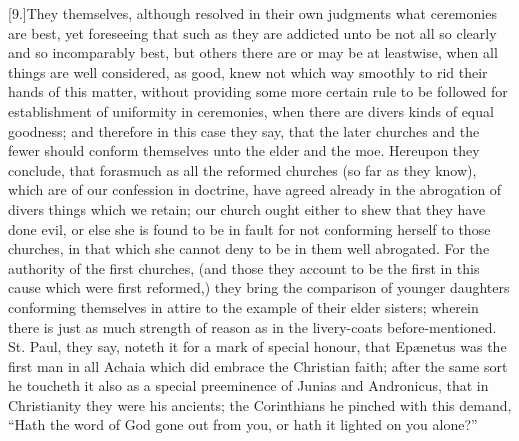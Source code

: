 [9.]They themselves, although resolved in their own judgments what ceremonies are best, yet foreseeing that such as they are addicted unto be not all so clearly and so incomparably best, but others there are or may be at leastwise, when all things are well considered, as good, knew not which way smoothly to rid their hands of this matter, without providing some more certain rule to be followed for establishment of uniformity in ceremonies, when there are divers kinds of equal goodness; and therefore in this case they say, that the later churches and the fewer should conform themselves unto the elder and the moe. Hereupon they conclude, that forasmuch as all the reformed churches (so far as they know), which are of our confession in doctrine, have agreed already in the abrogation of divers things which we retain; our church ought either to shew that they have done evil, or else she is found to be in fault for not conforming herself to those churches, in that which she cannot deny to be in them well abrogated. For the authority of the first churches, (and those they account to be the first in this cause which were first reformed,) they bring the comparison of younger daughters conforming themselves in attire to the example of their elder sisters; wherein there is just as much strength of reason as in the livery-coats before-mentioned. St. Paul, they say, noteth it for a mark of special honour, that Epænetus was the first man in all Achaia which did embrace the Christian faith; after the same sort he toucheth it also as a special preeminence of Junias and Andronicus, that in Christianity they were his ancients; the Corinthians he pinched with this demand, “Hath the word of God gone out from you, or hath it lighted on you alone?”

